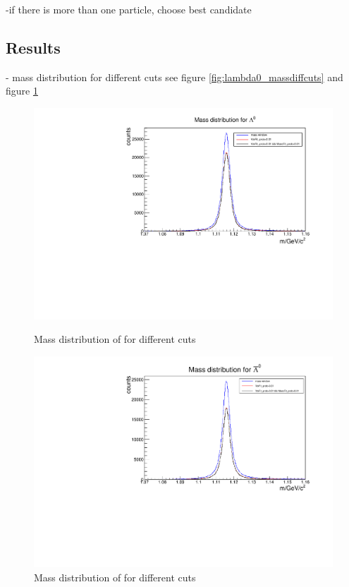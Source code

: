 		-if there is more than one particle, choose best candidate
		
		
	\subsection{Results}
	
		- mass distribution for different cuts see figure \ref{fig:lambda0_massdiffcuts} and figure \ref{fig:antilambda0_massdiffcuts}
		
		\begin{figure}
			\centering
				\includegraphics[width=1.1\textwidth]{./plots/lambda0/lambda0_m_diffcuts.pdf}
			\caption{Mass distribution of \lam for different cuts}
			\label{fig:lambda0_massdiffcuts}
			
				\includegraphics[width=1.1\textwidth]{./plots/antilambda0/antiLambda0_m_diffcuts.pdf}
			\caption{Mass distribution of \alam for different cuts}
			\label{fig:antilambda0_massdiffcuts}
		\end{figure}
		
